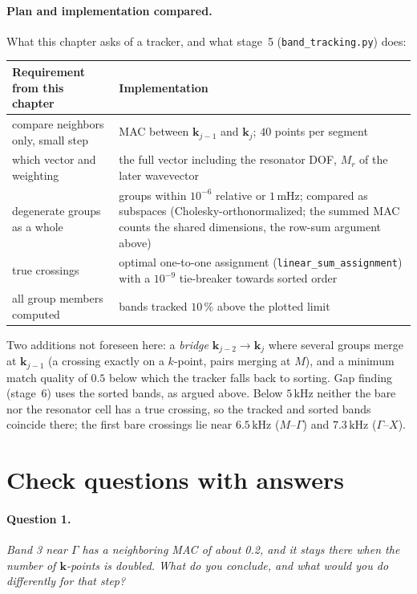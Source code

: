 \paragraph{Plan and implementation compared.} What this chapter asks of a tracker, and
what stage~5 (\texttt{band\_tracking.py}) does:
\begin{center}
\begin{tabular}{|p{}|p{}|}
\hline
Requirement from this chapter & Implementation \\
\hline
compare neighbors only, small step & MAC between $\mathbf{k}_{j-1}$ and $\mathbf{k}_j$; $40$ points per segment \\
which vector and weighting & the full vector including the resonator DOF, $M_r$ of the later wavevector \\
degenerate groups as a whole & groups within $10^{-6}$ relative or $1\,\mathrm{mHz}$; compared as subspaces (Cholesky-orthonormalized; the summed MAC counts the shared dimensions, the row-sum argument above) \\
true crossings & optimal one-to-one assignment (\texttt{linear\_sum\_assignment}) with a $10^{-9}$ tie-breaker towards sorted order \\
all group members computed & bands tracked $10\,\%$ above the plotted limit \\
\hline
\end{tabular}
\end{center}
Two additions not foreseen here: a \emph{bridge} $\mathbf{k}_{j-2} \to \mathbf{k}_j$
where several groups merge at $\mathbf{k}_{j-1}$ (a crossing exactly on a $k$-point,
pairs merging at $M$), and a minimum match quality of $0.5$ below which the tracker
falls back to sorting. Gap finding (stage~6) uses the sorted bands, as argued above.
Below $5\,\mathrm{kHz}$ neither the bare nor the resonator cell has a true crossing,
so the tracked and sorted bands coincide there; the first bare crossings lie near
$6.5\,\mathrm{kHz}$ ($M$--$\Gamma$) and $7.3\,\mathrm{kHz}$ ($\Gamma$--$X$).

\section{Check questions with answers}

\paragraph{Question 1.} \emph{Band 3 near $\Gamma$ has a neighboring MAC of about 0.2,
and it stays there when the number of $\mathbf{k}$-points is doubled. What do you
conclude, and what would you do differently for that step?}

